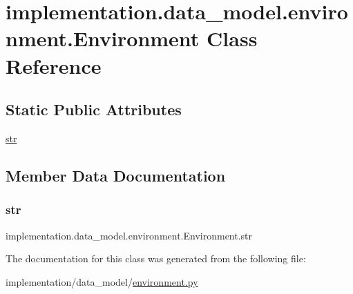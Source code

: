 \hypertarget{classimplementation_1_1data__model_1_1environment_1_1_environment}{}\section{implementation.\+data\+\_\+model.\+environment.\+Environment Class Reference}
\label{classimplementation_1_1data__model_1_1environment_1_1_environment}
\subsection*{Static Public Attributes}
\begin{DoxyCompactItemize}
\item 
\hyperlink{classimplementation_1_1data__model_1_1environment_1_1_environment_a8ae9a68fead7ddcdf8b34193848ae53d}{str}
\end{DoxyCompactItemize}


\subsection{Member Data Documentation}
\mbox{\label{classimplementation_1_1data__model_1_1environment_1_1_environment_a8ae9a68fead7ddcdf8b34193848ae53d}} 
\subsubsection{\texorpdfstring{str}{str}}
{\footnotesize\ttfamily implementation.\+data\+\_\+model.\+environment.\+Environment.\+str\hspace{0.3cm}{\ttfamily [static]}}



The documentation for this class was generated from the following file\+:\begin{DoxyCompactItemize}
\item 
implementation/data\+\_\+model/\hyperlink{environment_8py}{environment.\+py}\end{DoxyCompactItemize}

